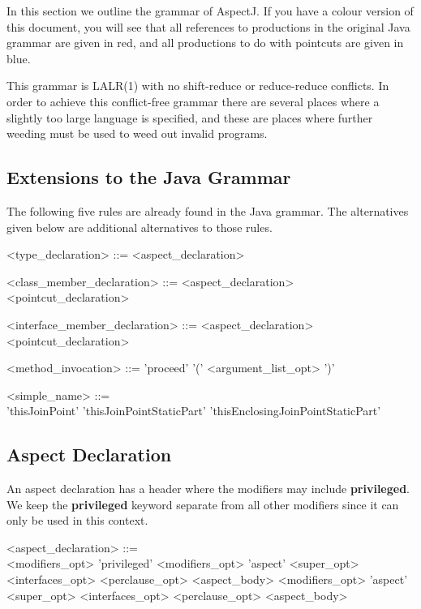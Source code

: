 In this section we outline the grammar of AspectJ.   If you have a colour
version of this document,  you will see that all references to
productions in the original Java grammar are given in red,  and all
productions to do with pointcuts are given in blue.

This grammar is LALR(1) with no shift-reduce or reduce-reduce conflicts.
In order to achieve this conflict-free grammar there are several places
where a slightly too large language is specified, and these are places
where further weeding must be used to weed out invalid programs.

\subsection{Extensions to the Java Grammar}

The following five rules are already found in the Java grammar.  The
alternatives given below are additional alternatives to those rules.

\begin{minipage}{6in}
\begin{grammar}
<{\red type_declaration}> ::= <aspect_declaration>

<{\red class_member_declaration}> ::= <aspect_declaration>
                            \alt      <pointcut_declaration>

<{\red interface_member_declaration}> ::= <aspect_declaration>
                                 \alt     <pointcut_declaration>

<{\red method_invocation}> ::= 'proceed' '(' {\red <argument_list_opt>} ')'

<{\red simple_name}> ::=  \hspace{1in} \\
                  'thisJoinPoint' 
         \alt     'thisJoinPointStaticPart'
         \alt     'thisEnclosingJoinPointStaticPart'
\end{grammar}
\end{minipage}

\subsection{Aspect Declaration}

An aspect declaration has a header where the modifiers may include
{\bf privileged}.   We keep the {\bf privileged} keyword
separate from all other modifiers since it can only be used in this
context.   

\begin{minipage}{6in}
\begin{grammar}
<aspect_declaration> ::= \hspace{1in} \\
        {\red <modifiers_opt>} 'privileged' {\red <modifiers_opt>} 'aspect' {} 
          {\red <super_opt> <interfaces_opt>} <perclause_opt> <aspect_body>
\alt
        {\red <modifiers_opt>} 'aspect' {}
        {\red<super_opt> <interfaces_opt>} <perclause_opt> <aspect_body>
\end{grammar}
\end{minipage}

